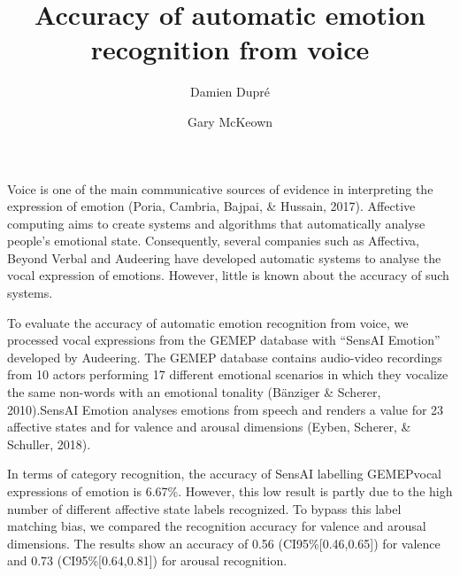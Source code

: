 \documentclass[]{elsarticle} %
\begin{document}
\begin{frontmatter}

  \title{Accuracy of automatic emotion recognition from voice}
    \author[University College Dublin]{Damien Dupré}
    \author[Queen's University Belfast]{Gary McKeown}
  
      \address[University College Dublin]{The Insight Centre for Data Analytics, University College Dublin,
Republic of Ireland}
    \address[Queen's University Belfast]{School of Psychology, Queen's University Belfast, United Kingdom}
  
  \begin{abstract}
  
  \end{abstract}
  
 \end{frontmatter}

Voice is one of the main communicative sources of evidence in
interpreting the expression of emotion (Poria, Cambria, Bajpai, \&
Hussain, 2017). Affective computing aims to create systems and
algorithms that automatically analyse people's emotional state.
Consequently, several companies such as Affectiva, Beyond Verbal and
Audeering have developed automatic systems to analyse the vocal
expression of emotions. However, little is known about the accuracy of
such systems.

To evaluate the accuracy of automatic emotion recognition from voice, we
processed vocal expressions from the GEMEP database with ``SensAI
Emotion'' developed by Audeering. The GEMEP database contains
audio-video recordings from 10 actors performing 17 different emotional
scenarios in which they vocalize the same non-words with an emotional
tonality (Bänziger \& Scherer, 2010).SensAI Emotion analyses emotions
from speech and renders a value for 23 affective states and for valence
and arousal dimensions (Eyben, Scherer, \& Schuller, 2018).

In terms of category recognition, the accuracy of SensAI labelling
GEMEPvocal expressions of emotion is 6.67\%. However, this low result is
partly due to the high number of different affective state labels
recognized. To bypass this label matching bias, we compared the
recognition accuracy for valence and arousal dimensions. The results
show an accuracy of 0.56 (CI95\%{[}0.46,0.65{]}) for valence and 0.73
(CI95\%{[}0.64,0.81{]}) for arousal recognition.
\end{document}
